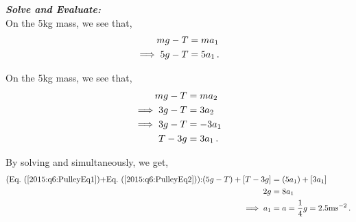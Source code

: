 \begin{subquestions}
\textbf{\textit{Solve and Evaluate:}} \\
On the 5kg mass, we see that,
\begin{align}
	mg - T & = ma_1 \nonumber \\
	\implies 5g-T & = 5a_1 \,. \label{2015:q6:PulleyEq1}
\end{align}

On the 5kg mass, we see that,
\begin{align}
	mg - T & = ma_2 \nonumber \\
	\implies 3g-T & = 3a_2 \nonumber \\
	\implies 3g-T & = -3a_1 \nonumber \\
	T-3g & = 3a_1 \,. \label{2015:q6:PulleyEq2}
\end{align}




By solving  and  simultaneously, we get,
\begin{align}
	\text{(\req{2015:q6:PulleyEq1}+\req{2015:q6:PulleyEq2}):} (5g-T)+[T-3g] & = (5a_1)+[3a_1] \nn \\
																	2g & = 8a_1 \nn \\
																	\implies a_1 & = a = \frac{1}{4}g = 2.5\text{ms}^{-2} \,.
\end{align}




\end{subquestions}